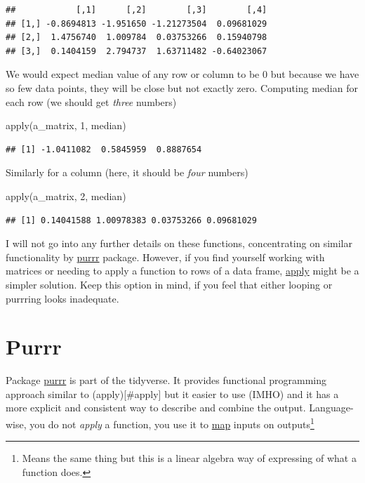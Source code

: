 \documentclass[
]{book}
\newenvironment{Shaded}{\begin{snugshade}}{\end{snugshade}}
\newcommand{\DecValTok}[1]{\textcolor[rgb]{0.00,0.00,0.81}{#1}}
\newcommand{\FunctionTok}[1]{\textcolor[rgb]{0.00,0.00,0.00}{#1}}
\newcommand{\NormalTok}[1]{#1}
\begin{document}
\begin{verbatim}
##            [,1]      [,2]        [,3]        [,4]
## [1,] -0.8694813 -1.951650 -1.21273504  0.09681029
## [2,]  1.4756740  1.009784  0.03753266  0.15940798
## [3,]  0.1404159  2.794737  1.63711482 -0.64023067
\end{verbatim}

We would expect median value of any row or column to be 0 but because we have so few data points, they will be close but not exactly zero. Computing median for each row (we should get \emph{three} numbers)

\begin{Shaded}
\begin{Highlighting}[]
\FunctionTok{apply}\NormalTok{(a\_matrix, }\DecValTok{1}\NormalTok{, median)}
\end{Highlighting}
\end{Shaded}

\begin{verbatim}
## [1] -1.0411082  0.5845959  0.8887654
\end{verbatim}

Similarly for a column (here, it should be \emph{four} numbers)

\begin{Shaded}
\begin{Highlighting}[]
\FunctionTok{apply}\NormalTok{(a\_matrix, }\DecValTok{2}\NormalTok{, median)}
\end{Highlighting}
\end{Shaded}

\begin{verbatim}
## [1] 0.14041588 1.00978383 0.03753266 0.09681029
\end{verbatim}

I will not go into any further details on these functions, concentrating on similar functionality by \protect\hyperlink{purrr}{purrr} package. However, if you find yourself working with matrices or needing to apply a function to rows of a data frame, \href{https://stat.ethz.ch/R-manual/R-devel/library/base/html/apply.html}{apply} might be a simpler solution. Keep this option in mind, if you feel that either looping or purrring looks inadequate.

\hypertarget{purrr}{%
\section{Purrr}\label{purrr}}

Package \href{https://purrr.tidyverse.org/}{purrr} is part of the tidyverse. It provides functional programming approach similar to (apply){[}\#apply{]} but it easier to use (IMHO) and it has a more explicit and consistent way to describe and combine the output. Language-wise, you do not \emph{apply} a function, you use it to \href{https://purrr.tidyverse.org/reference/map.html}{map} inputs on outputs\footnote{Means the same thing but this is a linear algebra way of expressing of what a function does.}
\end{document}
